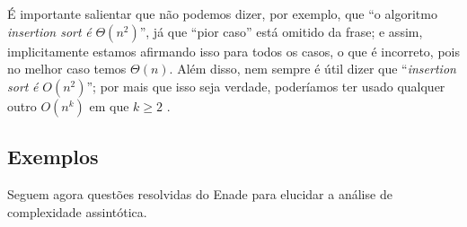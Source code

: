\documentclass[12pt,a4paper]{article}
\begin{document}
É importante salientar que não podemos dizer, por exemplo, que ``o algoritmo \textit{insertion sort} \emph{é} $\Theta(n^2)$'',
já que ``pior caso'' está omitido da frase; e assim, implicitamente estamos afirmando isso para todos os casos,
o que é incorreto, pois no melhor caso temos $\Theta(n)$.
Além disso, nem sempre é útil dizer que ``\textit{insertion sort} \emph{é} $O(n^2)$''; por mais que isso seja verdade,
poderíamos ter usado qualquer outro $O(n^k)$ em que $k \ge 2$ \parencite[56--57]{clrs2022}.
\newpage

\subsection{Exemplos}
Seguem agora questões resolvidas do Enade para elucidar a análise de complexidade assintótica.
\end{document}
